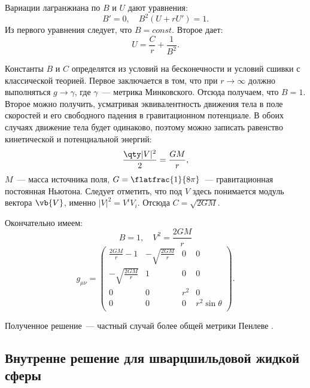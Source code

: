 \documentclass[\docroot/reports/draft/report.tex]{subfiles}
\begin{document}
    Вариации лагранжиана по $B$ и $U$ дают уравнения:
    \begin{equation*}
        B' = 0 , \quad B^2 (U + r U') = 1 .
    \end{equation*}
    Из первого уравнения следует, что $B = const$. Второе дает:
    \begin{equation*}
        U = \frac{C}{r} + \frac{1}{B^2} .
    \end{equation*}

    Константы $B$ и $C$ определятся из условий на бесконечности и условий сшивки с классической теорией. Первое заключается в том, что при $r \to \infty$ должно выполняться $g \to \gamma$, где $\gamma$~--- метрика Минковского. Отсюда получаем, что $B = 1$. Второе можно получить, усматривая эквивалентность движения тела в поле скоростей и его свободного падения в гравитационном потенциале. В обоих случаях движение тела будет одинаково, поэтому можно записать равенство кинетической и потенциальной энергий:
    \begin{equation*}
        \frac{\qty|V|^2}{2} = \frac{G M}{r} ,
    \end{equation*}
    $M$~--- масса источника поля, $G = \flatfrac{1}{8\pi}$~--- гравитационная постоянная Ньютона. Следует отметить, что под $V$ здесь понимается модуль вектора $\vb{V}$, именно $|V|^2 = V^i V_i$. Отсюда $C = \sqrt{2 G M}$.

    Окончательно имеем:
    \begin{equation*}
        B = 1, \quad V^2 = \frac{2 G M}{r}
    \end{equation*}
    \begin{equation*}
        g_{\mu\nu} = \begin{pmatrix}
            \frac{2 G M}{r} - 1 & -\sqrt{\frac{2 G M}{r}} & 0 & 0 \\
            -\sqrt{\frac{2 G M}{r}} & 1 & 0 & 0 \\
            0 & 0 & r^2 & 0 \\
            0 & 0 & 0 & r^2 \sin\theta \\
        \end{pmatrix} .
    \end{equation*}

    Полученное решение~--- частный случай более общей метрики Пенлеве \cite{burlankov_new_phys}.

\subsection{Внутренне решение для шварцшильдовой жидкой сферы}
\end{document}

